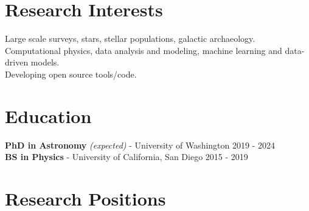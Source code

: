 \documentclass[margin,line]{resume}
\begin{document}
\begin{resume}

\section{\mysidestyle \textcolor{bcolor}{Research Interests}}
Large scale surveys, stars, stellar populations, galactic archaeology. \\
Computational physics, data analysis and modeling, machine learning and data-driven models. \\
Developing open source tools/code.
 
       
\section{\mysidestyle \textcolor{bcolor}{Education}}
\textbf{PhD in Astronomy} \textit{(expected)} - University of Washington  \hfill 2019 - 2024 \\
\textbf{BS in Physics} - University of California, San Diego \hfill 2015 - 2019 
	



\section{\mysidestyle \textcolor{bcolor}{Research Positions}}


\end{resume}
\end{document}
